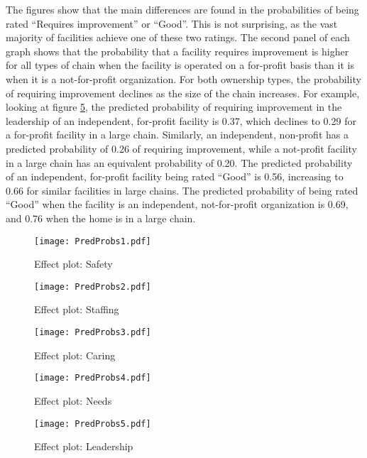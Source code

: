 \documentclass[a4paper,11pt,titlepage,british]{article}
\begin{document}
The figures show that the main differences are found in the probabilities of being rated ``Requires improvement'' or ``Good''. This is not surprising, as the vast majority of facilities achieve one of these two ratings. The second panel of each graph shows that the probability that a facility requires improvement is higher for all types of chain when the facility is operated on a for-profit basis than it is when it is a not-for-profit organization.  For both ownership types, the probability of requiring improvement declines as the size of the chain increases.  For example, looking at figure \ref{fig:efplot5}, the predicted probability of requiring improvement in the leadership of an independent, for-profit facility is 0.37, which declines to 0.29 for a for-profit facility in a large chain.  Similarly, an independent, non-profit has a predicted probability of 0.26 of requiring improvement, while a not-profit facility in a large chain has an equivalent probability of 0.20.
The predicted probability of an independent, for-profit facility being rated ``Good'' is 0.56, increasing to 0.66 for similar facilities in large chains.  The predicted probability of being rated ``Good'' when the facility is an independent, not-for-profit organization is 0.69, and 0.76 when the home is in a large chain.


\begin{figure}
  \caption{Effect plot: Safety}
  \label{fig:efplot1}
  \texttt{[image: PredProbs1.pdf]}
\end{figure}

\begin{figure}
  \caption{Effect plot: Staffing}
  \label{fig:efplot2}
  \texttt{[image: PredProbs2.pdf]}
\end{figure}

\begin{figure}
  \caption{Effect plot: Caring}
  \label{fig:efplot3}
  \texttt{[image: PredProbs3.pdf]}
\end{figure}

\begin{figure}
  \caption{Effect plot: Needs}
  \label{fig:efplot4}
  \texttt{[image: PredProbs4.pdf]}
\end{figure}


\begin{figure}
  \caption{Effect plot: Leadership}
  \label{fig:efplot5}
  \texttt{[image: PredProbs5.pdf]}
\end{figure}
\end{document}
